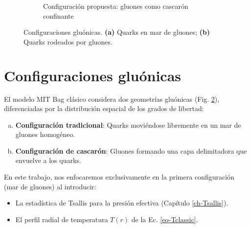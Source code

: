 \begin{figure}
\begin{subfigure}{0.21\textwidth}
        \caption{Configuración propuesta: gluones como cascarón confinante}
        \label{fig:shell}
    \end{subfigure}
    \caption{Configuraciones gluónicas. \textbf{(a)} Quarks en mar de gluones; \textbf{(b)} Quarks rodeados por gluones.}
    \label{fig:configs}
\end{figure}

\begin{center}
    \fboxrule=1pt
    \fboxsep=10pt
\end{center}

\section{Configuraciones gluónicas}\label{fig-gluon-configs}

El modelo MIT Bag clásico considera dos geometrías gluónicas (Fig. \ref{fig:configs}), diferenciadas por la distribución espacial de los grados de libertad:


\begin{enumerate}[(a)]
    \item \textbf{Configuración tradicional}: Quarks moviéndose libremente en un mar de gluones homogéneo.
    \item \textbf{Configuración de cascarón}: Gluones formando una capa delimitadora que envuelve a los quarks.
\end{enumerate}

En este trabajo, nos enfocaremos exclusivamente en la primera configuración (mar de gluones) al introducir:
\begin{itemize}
    \item La estadística de Tsallis para la presión efectiva (Capítulo \ref{ch-Tsallis}).
    \item El perfil radial de temperatura $T(r)$ de la Ec. \eqref{eq-Tclassic}.
\end{itemize}

